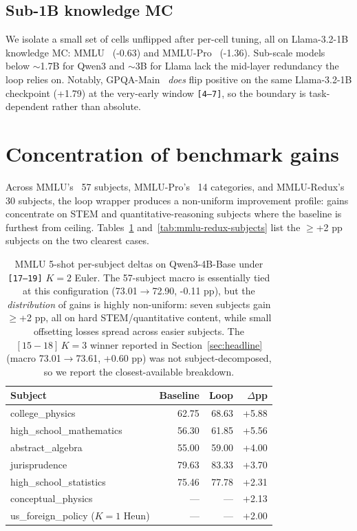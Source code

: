 \subsection{Sub-1B knowledge MC}

We isolate a small set of cells unflipped after per-cell tuning, all on Llama-3.2-1B knowledge MC: MMLU~\citep{hendrycks2021mmlu} (-0.63) and MMLU-Pro~\citep{wang2024mmlupro} (-1.36). Sub-scale models below $\sim$1.7B for Qwen3 and $\sim$3B for Llama lack the mid-layer redundancy the loop relies on. Notably, GPQA-Main~\citep{rein2024gpqa} \emph{does} flip positive on the same Llama-3.2-1B checkpoint (+1.79) at the very-early window \texttt{[4--7]}, so the boundary is task-dependent rather than absolute.

\section{Concentration of benchmark gains}
\label{app:per-subject}

Across MMLU's~\citep{hendrycks2021mmlu} 57 subjects, MMLU-Pro's~\citep{wang2024mmlupro} 14 categories, and MMLU-Redux's 30 subjects, the loop wrapper produces a non-uniform improvement profile: gains concentrate on STEM and quantitative-reasoning subjects where the baseline is furthest from ceiling. Tables~\ref{tab:mmlu-base-subjects} and~\ref{tab:mmlu-redux-subjects} list the $\geq$+2 pp subjects on the two clearest cases.

\begin{table}[h]
\centering
\footnotesize
\caption{MMLU 5-shot per-subject deltas on Qwen3-4B-Base under \texttt{[17--19]} $K{=}2$ Euler. The 57-subject macro is essentially tied at this configuration (73.01$\to$72.90, -0.11 pp), but the \emph{distribution} of gains is highly non-uniform: seven subjects gain $\geq$+2 pp, all on hard STEM/quantitative content, while small offsetting losses spread across easier subjects. The
$[15{-}18]\,K{=}3$ winner reported in Section~\ref{sec:headline} (macro 73.01$\to$73.61, +0.60 pp) was not subject-decomposed, so we report the closest-available breakdown.}
\label{tab:mmlu-base-subjects}
\setlength{\tabcolsep}{8pt}
\begin{tabular}{lrrr}
\toprule
Subject & Baseline & Loop & $\Delta$pp \\
\midrule
college\_physics                 & 62.75 & 68.63 & +5.88 \\
high\_school\_mathematics        & 56.30 & 61.85 & +5.56 \\
abstract\_algebra                & 55.00 & 59.00 & +4.00 \\
jurisprudence                    & 79.63 & 83.33 & +3.70 \\
high\_school\_statistics         & 75.46 & 77.78 & +2.31 \\
conceptual\_physics              &  ---   &  ---   & +2.13 \\
us\_foreign\_policy ($K{=}1$ Heun) &  ---   &  ---   & +2.00 \\
\bottomrule
\end{tabular}
\end{table}

